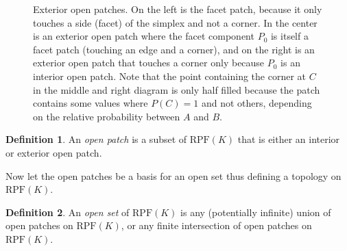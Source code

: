 \documentclass[twoside]{article}
\theoremstyle{plain}%
\theoremstyle{definition}
\newtheorem{definition}{Definition}[section]
\theoremstyle{remark}
\begin{document}
\begin{figure}[h]
{
}
\caption{Exterior open patches. On the left is the facet patch, because it only touches a side (facet) of the simplex and not a corner. In the center is an exterior open patch where the facet component \(P_0\) is itself a facet patch (touching an edge and a corner), and on the right is an exterior open patch that touches a corner only because \(P_0\) is an interior open patch. Note that the point containing the corner at \(C\) in the middle and right diagram is only half filled because the patch contains some values where \(P(C) = 1\) and not others, depending on the relative probability between \(A\) and \(B\).}
\label{fig:exterior_open_patch}
\end{figure}

\begin{definition}
An \textit{open patch} is a subset of \(\text{RPF}(K)\) that is either an interior or exterior open patch.
\end{definition}

Now let the open patches be a basis for an open set thus defining a topology on \(\text{RPF}(K)\).

\begin{definition}
An \textit{open set} of \(\text{RPF}(K)\) is any (potentially infinite) union of open patches on \(\text{RPF}(K)\), or any finite intersection of open patches on \(\text{RPF}(K)\).
\end{definition}
\end{document}
